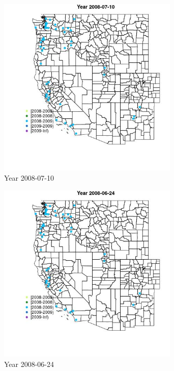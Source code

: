 \begin{figure} 
\centering  
\includegraphics[width=0.77\textwidth]{Code_Outputs/Report_ML_input_PM25_Step4_part_e_de_duplicated_aves_MapObsYear2008-07-10.jpg} 
\caption{\label{fig:Report_ML_input_PM25_Step4_part_e_de_duplicated_avesMapObsYear2008-07-10}Year 2008-07-10} 
\end{figure} 
 

\begin{figure} 
\centering  
\includegraphics[width=0.77\textwidth]{Code_Outputs/Report_ML_input_PM25_Step4_part_e_de_duplicated_aves_MapObsYear2008-06-24.jpg} 
\caption{\label{fig:Report_ML_input_PM25_Step4_part_e_de_duplicated_avesMapObsYear2008-06-24}Year 2008-06-24} 
\end{figure} 
 

